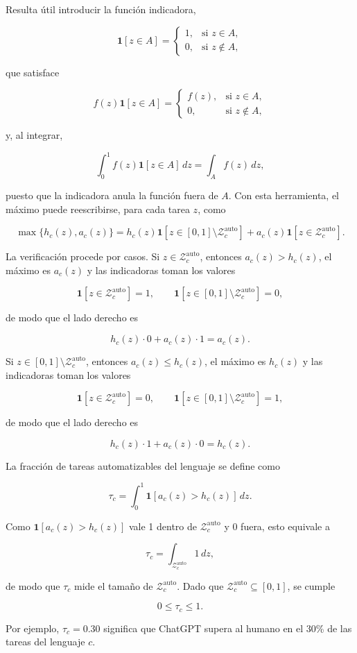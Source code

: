 \documentclass[12pt,a4paper]{article}
\newcommand{\Zauto}{\mathcal{Z}^{\mathrm{auto}}_c}
\newcommand{\one}{\mathbf{1}}
\newcommand{\dd}{\,dz}
\begin{document}
Resulta útil introducir la función indicadora,

\[
\one[z\in A]=
\begin{cases}
1, & \text{si }z\in A,\\
0, & \text{si }z\notin A,
\end{cases}
\]

que satisface

\[
f(z)\one[z\in A]=
\begin{cases}
f(z), & \text{si }z\in A,\\
0, & \text{si }z\notin A,
\end{cases}
\]

y, al integrar,

\[
\int_0^1 f(z)\one[z\in A]\dd=\int_A f(z)\dd,
\]

puesto que la indicadora anula la función fuera de $A$. Con esta herramienta, el máximo puede reescribirse, para cada tarea $z$, como

\[
\max\{h_c(z),a_c(z)\}
=h_c(z)\one[z\in[0,1]\setminus\Zauto]+a_c(z)\one[z\in\Zauto].
\]

La verificación procede por casos. Si $z\in\Zauto$, entonces $a_c(z)>h_c(z)$, el máximo es $a_c(z)$ y las indicadoras toman los valores

\[
\one[z\in\Zauto]=1,\qquad
\one[z\in[0,1]\setminus\Zauto]=0,
\]

de modo que el lado derecho es

\[
h_c(z)\cdot 0+a_c(z)\cdot 1=a_c(z).
\]

Si $z\in[0,1]\setminus\Zauto$, entonces $a_c(z)\leq h_c(z)$, el máximo es $h_c(z)$ y las indicadoras toman los valores

\[
\one[z\in\Zauto]=0,\qquad
\one[z\in[0,1]\setminus\Zauto]=1,
\]

de modo que el lado derecho es

\[
h_c(z)\cdot 1+a_c(z)\cdot 0=h_c(z).
\]

La fracción de tareas automatizables del lenguaje se define como

\[
\tau_c=\int_0^1 \one[a_c(z)>h_c(z)]\dd.
\]

Como $\one[a_c(z)>h_c(z)]$ vale 1 dentro de $\Zauto$ y 0 fuera, esto equivale a

\[
\tau_c=\int_{\Zauto}1\dd,
\]

de modo que $\tau_c$ mide el tamaño de $\Zauto$. Dado que $\Zauto\subseteq[0,1]$, se cumple

\[
0\leq\tau_c\leq 1.
\]

Por ejemplo, $\tau_c=0.30$ significa que ChatGPT supera al humano en el 30\% de las tareas del lenguaje $c$.
\end{document}
